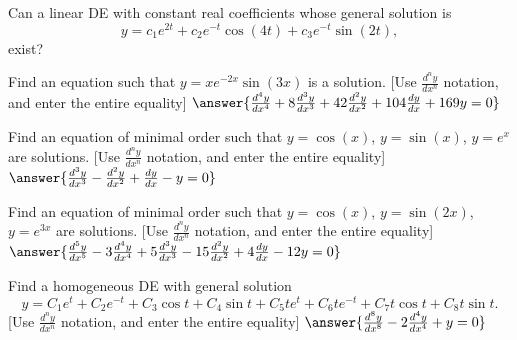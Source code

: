 \documentclass{ximera}
\begin{document}
\begin{exercise}
    Can a linear DE with constant real coefficients whose general solution is $$y=c_1e^{2t}+ c_2e^{-t}\cos(4t) + c_3e^{-t}\sin(2t),$$ %
    exist?
    \begin{multipleChoice}
    \end{multipleChoice}
\end{exercise}

\begin{exercise}
    Find an equation such that $y=xe^{-2x}\sin(3x)$ is a solution. [Use $\frac{d^ny}{dx^n}$ notation, and enter the entire equality] $\answer{\frac{d^4y}{dx^4} + 8\frac{d^3y}{dx^3} + 42\frac{d^2y}{dx^2} + 104\frac{dy}{dx} + 169y = 0}$
\end{exercise}

\begin{exercise}%
    Find an equation of minimal order such that $y=\cos(x)$, $y=\sin(x)$, $y=e^x$ are solutions. [Use $\frac{d^ny}{dx^n}$ notation, and enter the entire equality] $\answer{\frac{d^3y}{dx^3} - \frac{d^2y}{dx^2} + \frac{dy}{dx} - y = 0}$
\end{exercise}

\begin{exercise}
    Find an equation of minimal order such that $y=\cos(x)$, $y=\sin(2x)$, $y=e^{3x}$ are solutions. [Use $\frac{d^ny}{dx^n}$ notation, and enter the entire equality] $\answer{\frac{d^5y}{dx^5} - 3\frac{d^4y}{dx^4} + 5\frac{d^3y}{dx^3} - 15\frac{d^2y}{dx^2} + 4\frac{dy}{dx} - 12y = 0}$
\end{exercise}

\begin{exercise}
    Find a homogeneous DE with general solution %
    \[
        y=C_1e^t+ C_2e^{-t}+ C_3\cos t+ C_4\sin t + C_5te^t+ C_6te^{-t}+ C_7t\cos t+ C_8t\sin t.
    \]
    [Use $\frac{d^ny}{dx^n}$ notation, and enter the entire equality] $\answer{\frac{d^8y}{dx^8} - 2\frac{d^4y}{dx^4} + y = 0}$
\end{exercise}



\end{document}

